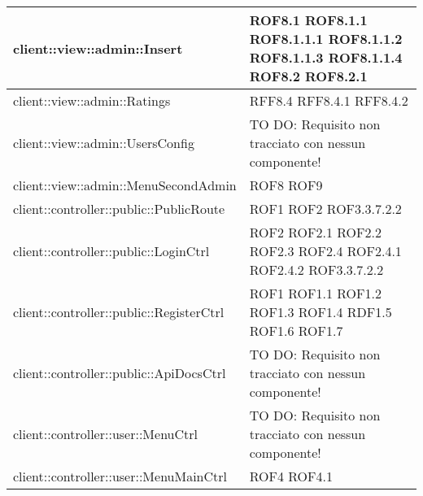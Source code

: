 \begin{center}
\begin{longtable}{| p{11cm} | p{2.5cm} |}
\hline
client::view::admin::Insert & ROF8.1 \newline ROF8.1.1 \newline ROF8.1.1.1 \newline ROF8.1.1.2 \newline ROF8.1.1.3 \newline ROF8.1.1.4 \newline ROF8.2 \newline ROF8.2.1 \\
\hline
client::view::admin::Ratings & RFF8.4 \newline RFF8.4.1 \newline RFF8.4.2 \\
\hline
client::view::admin::UsersConfig & TO DO: Requisito non tracciato con nessun componente! \\
\hline
client::view::admin::MenuSecondAdmin & ROF8 \newline ROF9 \\
\hline
client::controller::public::PublicRoute & ROF1 \newline ROF2 \newline ROF3.3.7.2.2 \\
\hline
client::controller::public::LoginCtrl & ROF2 \newline ROF2.1 \newline ROF2.2 \newline ROF2.3 \newline ROF2.4 \newline ROF2.4.1 \newline ROF2.4.2 \newline ROF3.3.7.2.2 \\
\hline
client::controller::public::RegisterCtrl & ROF1 \newline ROF1.1 \newline ROF1.2 \newline ROF1.3 \newline ROF1.4 \newline RDF1.5 \newline ROF1.6 \newline ROF1.7 \\
\hline
client::controller::public::ApiDocsCtrl & TO DO: Requisito non tracciato con nessun componente! \\
\hline
client::controller::user::MenuCtrl & TO DO: Requisito non tracciato con nessun componente! \\
\hline
client::controller::user::MenuMainCtrl & ROF4 \newline ROF4.1 \\

\end{longtable}
\end{center}
